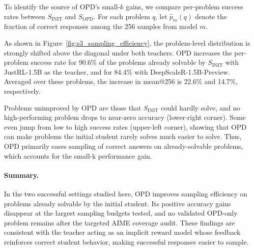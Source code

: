 To identify the source of OPD's small-\(k\) gains, we compare per-problem success rates between \(S_{\mathrm{INIT}}\) and \(S_{\mathrm{OPD}}\).
For each problem \(q\), let \(\hat{p}_m(q)\) denote the fraction of correct responses among the 256 samples from model \(m\).



As shown in Figure~\ref{fig:s3_sampling_efficiency}, the problem-level distribution is strongly shifted above the diagonal under both teachers.
OPD increases the per-problem success rate for 90.6\% of the problems already solvable by $S_{\mathrm{INIT}}$ with JustRL-1.5B as the teacher, and for 84.4\% with DeepScaleR-1.5B-Preview.
Averaged over these problems, the increase in mean@256 is 22.6\% and 14.7\%, respectively.

Problems unimproved by OPD are those that \(S_{\mathrm{INIT}}\) could hardly solve, and no high-performing problem drops to near-zero accuracy (lower-right corner).
Some even jump from low to high success rates (upper-left corner), showing that OPD can make problems the initial student rarely solves much easier to solve.
Thus, OPD primarily eases sampling of correct answers on already-solvable problems, which accounts for the small-k performance gain.

\paragraph{Summary.}
In the two successful settings studied here, OPD improves sampling efficiency on problems already solvable by the initial student.
Its positive accuracy gains disappear at the largest sampling budgets tested, and no validated OPD-only problem remains after the targeted AIME coverage audit.
These findings are consistent with the teacher acting as an implicit reward model whose feedback reinforces correct student behavior, making successful responses easier to sample.
